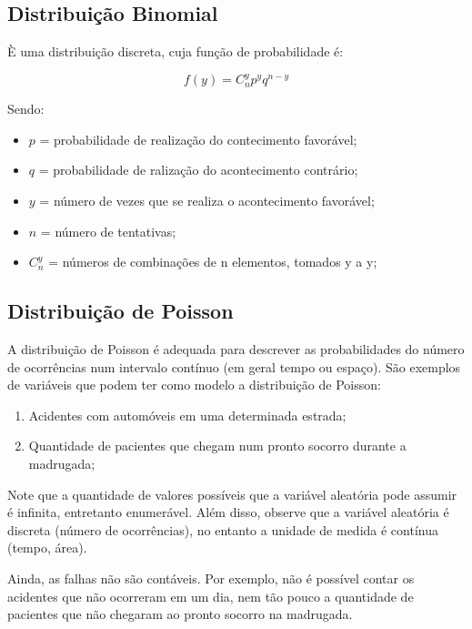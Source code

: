 \subsection{Distribuição Binomial}
\inic È uma distribuição discreta, cuja função de probabilidade é:
 
\begin{equation}
f(y) = C_{n}^{y}p^{y}q^{n-y}
\end{equation}
 
Sendo: \vskip0.3cm

\begin{itemize}
\item $p$ = probabilidade de realização do contecimento favorável; 
\item  $q$ = probabilidade de ralização do acontecimento contrário;  
\item $y$ = número de vezes que se realiza o acontecimento favorável;  
\item $n$ = número de tentativas; 
\item $C_{n}^{y}$ = números de combinações de n elementos, tomados y a y; 
\end{itemize} 

 

\newpage
\subsection{Distribuição de Poisson}
  
\inic A distribuição de Poisson é adequada para descrever as probabilidades do número de ocorrências num intervalo contínuo (em geral tempo ou espaço). São exemplos de variáveis que podem ter como modelo
a distribuição de Poisson:

\begin{enumerate}
    \item Acidentes com automóveis em uma determinada estrada;
    \item Quantidade de pacientes que chegam num pronto socorro durante a madrugada;
\end{enumerate}
 
\inic Note que a quantidade de valores possíveis que a variável aleatória pode assumir é infinita, entretanto enumerável. Além disso, observe que a variável aleatória é discreta (número de ocorrências), no entanto a unidade de medida é contínua (tempo, área).\vskip0.3cm

Ainda, as falhas não são contáveis. Por exemplo, não é possível contar os acidentes que não ocorreram em um dia, nem tão pouco a quantidade de pacientes que não chegaram ao pronto socorro na madrugada.
 
